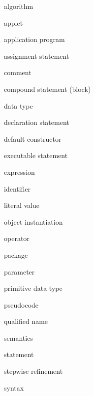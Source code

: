 \begin{KT}
algorithm

applet

application program

assignment statement

comment 

compound statement (block)

data type

declaration statement

default constructor

executable statement

expression

identifier

literal value

object instantiation

operator

package

parameter

primitive data type

pseudocode

qualified name

semantics

statement

stepwise refinement

syntax

\end{KT}


